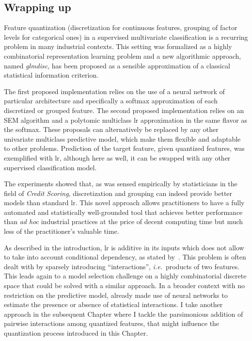\subsection{Wrapping up}

Feature quantization (discretization for continuous features, grouping of factor levels for categorical ones) in a supervised multivariate classification is a recurring problem in many industrial contexts. This setting was formalized as a highly combinatorial representation learning problem and a new algorithmic approach, named \textit{glmdisc}, has been proposed as a sensible approximation of a classical statistical information criterion.

The first proposed implementation relies on the use of a neural network of particular architecture and specifically a softmax approximation of each discretized or grouped feature. The second proposed implementation relies on an SEM algorithm and a polytomic multiclass \gls{lr} approximation in the same flavor as the softmax. These proposals can alternatively be replaced by any other univariate multiclass predictive model, which make them flexible and adaptable to other problems. Prediction of the target feature, given quantized features, was exemplified with \gls{lr}, although here as well, it can be swapped with any other supervised classification model.

The experiments showed that, as was sensed empirically by statisticians in the field of \textit{Credit Scoring}, discretization and grouping can indeed provide better models than standard \gls{lr}. This novel approach allows practitioners to have a fully automated and statistically well-grounded tool that achieves better performance than \textit{ad hoc} industrial practices at the price of decent computing time but much less of the practitioner's valuable time.

As described in the introduction, \gls{lr} is additive in its inputs which does not allow to take into account conditional dependency, as stated by~\cite{berry2010testing}. This problem is often dealt with by sparsely introducing ``interactions'', \textit{i.e.}\ products of two features. This leads again to a model selection challenge on a highly combinatorial discrete space that could be solved with a similar approach. In a broader context with no restriction on the predictive model, \cite{tsang2018detecting} already made use of neural networks to estimate the presence or absence of statistical interactions. I take another approach in the subsequent Chapter where I tackle the parsimonious addition of pairwise interactions among quantized features, that might influence the quantization process introduced in this Chapter.




\printbibliography[heading=subbibliography, title=References of Chapter 3]

